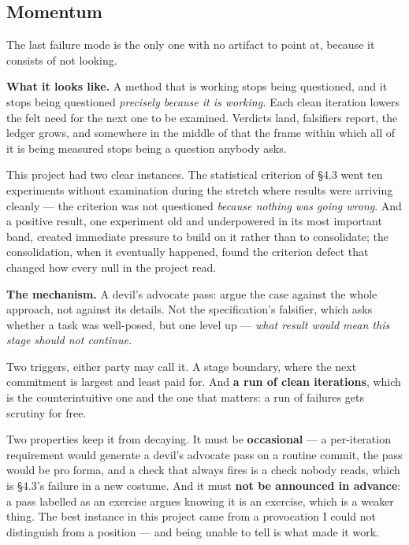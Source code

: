 \subsection{Momentum}

The last failure mode is the only one with no artifact to point at, because it consists of not looking.

\textbf{What it looks like.} A method that is working stops being questioned, and it stops being questioned \textit{precisely because it is working.} Each clean iteration lowers the felt need for the next one to be examined. Verdicts land, falsifiers report, the ledger grows, and somewhere in the middle of that the frame within which all of it is being measured stops being a question anybody asks.

This project had two clear instances. The statistical criterion of \S4.3 went ten experiments without examination during the stretch where results were arriving cleanly --- the criterion was not questioned \textit{because nothing was going wrong}. And a positive result, one experiment old and underpowered in its most important band, created immediate pressure to build on it rather than to consolidate; the consolidation, when it eventually happened, found the criterion defect that changed how every null in the project read.

\textbf{The mechanism.} A devil's advocate pass: argue the case against the whole approach, not against its details. Not the specification's falsifier, which asks whether a task was well-posed, but one level up --- \textit{what result would mean this stage should not continue.}

Two triggers, either party may call it. A stage boundary, where the next commitment is largest and least paid for. And \textbf{a run of clean iterations}, which is the counterintuitive one and the one that matters: a run of failures gets scrutiny for free.

Two properties keep it from decaying. It must be \textbf{occasional} --- a per-iteration requirement would generate a devil's advocate pass on a routine commit, the pass would be pro forma, and a check that always fires is a check nobody reads, which is \S4.3's failure in a new costume. And it must \textbf{not be announced in advance}: a pass labelled as an exercise argues knowing it is an exercise, which is a weaker thing. The best instance in this project came from a provocation I could not distinguish from a position --- and being unable to tell is what made it work.

